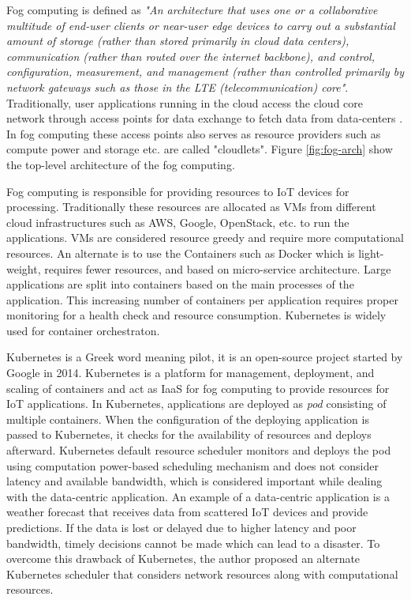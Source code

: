   Fog computing is defined as \emph{"An architecture that uses one or a collaborative multitude of end-user clients or near-user edge devices to carry out a substantial amount of storage (rather than stored primarily in cloud data centers), communication (rather than routed over the internet backbone), and control, configuration, measurement, and management (rather than controlled primarily by network gateways such as those in the LTE (telecommunication) core"}\cite{10.1145/3057266}. Traditionally, user applications running in the cloud access the cloud core network through access points for data exchange to fetch data from data-centers \cite{Bittencourt2017}. In fog computing these access points also serves as resource providers such as compute power and storage etc. are called "cloudlets"\cite{Bittencourt2017}. Figure \ref{fig:fog-arch} show the top-level architecture of the fog computing. \par
  Fog computing is responsible for providing resources to IoT devices for processing\cite{Santos2019}. Traditionally these resources are allocated as VMs from different cloud infrastructures such as AWS, Google, OpenStack, etc. to run the applications. VMs are considered resource greedy and require more computational resources. An alternate is to use the Containers such as Docker which is light-weight, requires fewer resources, and based on micro-service architecture. Large applications are split into containers based on the main processes of the application. This increasing number of containers per application requires proper monitoring for a health check and resource consumption\cite{k8s}. Kubernetes is widely used for container orchestraton. \par
  Kubernetes is a Greek word meaning pilot, it is an open-source project started by Google in 2014\cite{k8s}. Kubernetes is a platform for management, deployment, and scaling of containers\cite{k8s} and act as IaaS for fog computing to provide resources for IoT applications. In Kubernetes, applications are deployed as \emph{pod} consisting of multiple containers. When the configuration of the deploying application is passed to Kubernetes, it checks for the availability of resources and deploys afterward\cite{k8s}. Kubernetes default resource scheduler monitors and deploys the pod using computation power-based scheduling mechanism and does not consider latency and available bandwidth, which is considered important while dealing with the data-centric application\cite{Santos2019}. An example of a data-centric application is a weather forecast that receives data from scattered IoT devices and provide predictions. If the data is lost or delayed due to higher latency and poor bandwidth, timely decisions cannot be made which can lead to a disaster. To overcome this drawback of Kubernetes, the author proposed an alternate Kubernetes scheduler that considers network resources along with computational resources\cite{Santos2019}. \par
